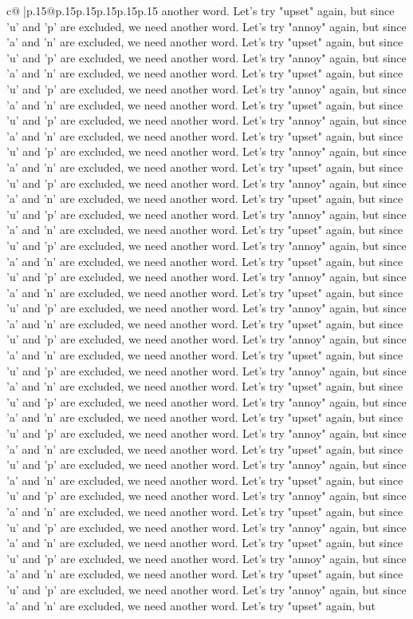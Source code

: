 \documentclass{article}
\begin{document}
{\begin{supertabular}{c@{$\;$}|p{.15\linewidth}@{}p{.15\linewidth}p{.15\linewidth}p{.15\linewidth}p{.15\linewidth}p{.15\linewidth}}
{{{another word. Let's try "upset" again, but since 'u' and 'p' are excluded, we need another word. Let's try "annoy" again, but since 'a' and 'n' are excluded, we need another word. Let's try "upset" again, but since 'u' and 'p' are excluded, we need another word. Let's try "annoy" again, but since 'a' and 'n' are excluded, we need another word. Let's try "upset" again, but since 'u' and 'p' are excluded, we need another word. Let's try "annoy" again, but since 'a' and 'n' are excluded, we need another word. Let's try "upset" again, but since 'u' and 'p' are excluded, we need another word. Let's try "annoy" again, but since 'a' and 'n' are excluded, we need another word. Let's try "upset" again, but since 'u' and 'p' are excluded, we need another word. Let's try "annoy" again, but since 'a' and 'n' are excluded, we need another word. Let's try "upset" again, but since 'u' and 'p' are excluded, we need another word. Let's try "annoy" again, but since 'a' and 'n' are excluded, we need another word. Let's try "upset" again, but since 'u' and 'p' are excluded, we need another word. Let's try "annoy" again, but since 'a' and 'n' are excluded, we need another word. Let's try "upset" again, but since 'u' and 'p' are excluded, we need another word. Let's try "annoy" again, but since 'a' and 'n' are excluded, we need another word. Let's try "upset" again, but since 'u' and 'p' are excluded, we need another word. Let's try "annoy" again, but since 'a' and 'n' are excluded, we need another word. Let's try "upset" again, but since 'u' and 'p' are excluded, we need another word. Let's try "annoy" again, but since 'a' and 'n' are excluded, we need another word. Let's try "upset" again, but since 'u' and 'p' are excluded, we need another word. Let's try "annoy" again, but since 'a' and 'n' are excluded, we need another word. Let's try "upset" again, but since 'u' and 'p' are excluded, we need another word. Let's try "annoy" again, but since 'a' and 'n' are excluded, we need another word. Let's try "upset" again, but since 'u' and 'p' are excluded, we need another word. Let's try "annoy" again, but since 'a' and 'n' are excluded, we need another word. Let's try "upset" again, but since 'u' and 'p' are excluded, we need another word. Let's try "annoy" again, but since 'a' and 'n' are excluded, we need another word. Let's try "upset" again, but since 'u' and 'p' are excluded, we need another word. Let's try "annoy" again, but since 'a' and 'n' are excluded, we need another word. Let's try "upset" again, but since 'u' and 'p' are excluded, we need another word. Let's try "annoy" again, but since 'a' and 'n' are excluded, we need another word. Let's try "upset" again, but since 'u' and 'p' are excluded, we need another word. Let's try "annoy" again, but since 'a' and 'n' are excluded, we need another word. Let's try "upset" again, but since 'u' and 'p' are excluded, we need another word. Let's try "annoy" again, but since 'a' and 'n' are excluded, we need another word. Let's try "upset" again, but since 'u' and 'p' are excluded, we need another word. Let's try "annoy" again, but since 'a' and 'n' are excluded, we need another word. Let's try "upset" again, but }}}
\end{supertabular}}
\end{document}
